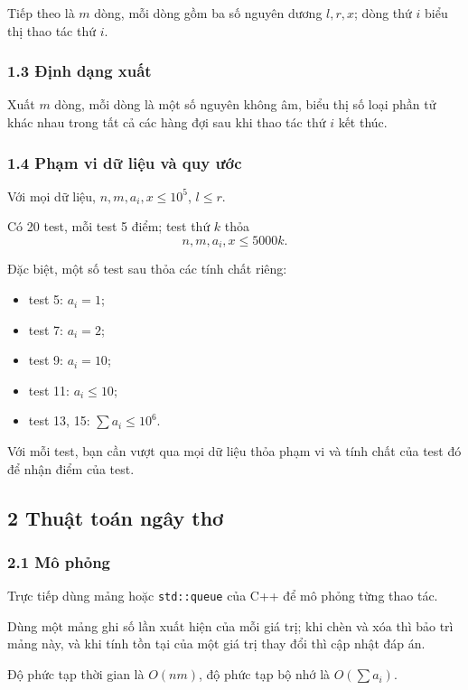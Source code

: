 \documentclass[11pt]{article}
\begin{document}
Tiếp theo là \(m\) dòng, mỗi dòng gồm ba số nguyên dương \(l,r,x\); dòng thứ
\(i\) biểu thị thao tác thứ \(i\).

\subsubsection*{1.3 Định dạng xuất}

Xuất \(m\) dòng, mỗi dòng là một số nguyên không âm, biểu thị số loại phần tử
khác nhau trong tất cả các hàng đợi sau khi thao tác thứ \(i\) kết thúc.

\subsubsection*{1.4 Phạm vi dữ liệu và quy ước}

Với mọi dữ liệu, \(n,m,a_i,x\le 10^5\), \(l\le r\).

Có 20 test, mỗi test 5 điểm; test thứ \(k\) thỏa
\[
  n,m,a_i,x\le 5000k .
\]

Đặc biệt, một số test sau thỏa các tính chất riêng:
\begin{itemize}
  \item test 5: \(a_i=1\);
  \item test 7: \(a_i=2\);
  \item test 9: \(a_i=10\);
  \item test 11: \(a_i\le 10\);
  \item test 13, 15: \(\sum a_i\le 10^6\).
\end{itemize}

Với mỗi test, bạn cần vượt qua mọi dữ liệu thỏa phạm vi và tính chất của test đó
để nhận điểm của test.

\subsection*{2 Thuật toán ngây thơ}

\subsubsection*{2.1 Mô phỏng}

Trực tiếp dùng mảng hoặc \texttt{std::queue} của C++ để mô phỏng từng thao tác.

Dùng một mảng ghi số lần xuất hiện của mỗi giá trị; khi chèn và xóa thì bảo trì
mảng này, và khi tính tồn tại của một giá trị thay đổi thì cập nhật đáp án.

Độ phức tạp thời gian là \(O(nm)\), độ phức tạp bộ nhớ là \(O(\sum a_i)\).
\end{document}
